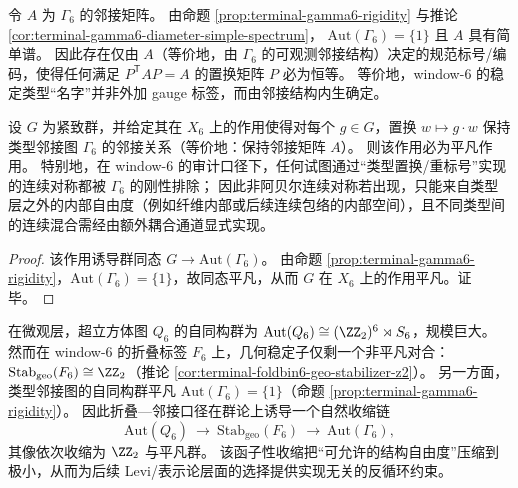 \begin{corollary}\label{cor:terminal-gamma6-canonical-addressing}
令 \(A\) 为 \(\Gamma_6\) 的邻接矩阵。
由命题 \ref{prop:terminal-gamma6-rigidity} 与推论 \ref{cor:terminal-gamma6-diameter-simple-spectrum}，
\(\mathrm{Aut}(\Gamma_6)=\{1\}\) 且 \(A\) 具有简单谱。
因此存在仅由 \(A\)（等价地，由 \(\Gamma_6\) 的可观测邻接结构）决定的规范标号/编码，使得任何满足
\(
P^{\mathsf T}AP=A
\)
的置换矩阵 \(P\) 必为恒等。
等价地，window-\(6\) 的稳定类型“名字”并非外加 gauge 标签，而由邻接结构内生确定。
\end{corollary}

\begin{corollary}\label{cor:terminal-gamma6-no-continuous-nonabelian-symmetry}
设 \(G\) 为紧致群，并给定其在 \(X_6\) 上的作用使得对每个 \(g\in G\)，置换 \(w\mapsto g\cdot w\) 保持类型邻接图 \(\Gamma_6\) 的邻接关系（等价地：保持邻接矩阵 \(A\)）。
则该作用必为平凡作用。
特别地，在 window-\(6\) 的审计口径下，任何试图通过“类型置换/重标号”实现的连续对称都被 \(\Gamma_6\) 的刚性排除；
因此非阿贝尔连续对称若出现，只能来自类型层之外的内部自由度（例如纤维内部或后续连续包络的内部空间），且不同类型间的连续混合需经由额外耦合通道显式实现。
\end{corollary}
\begin{proof}
该作用诱导群同态 \(G\to \mathrm{Aut}(\Gamma_6)\)。
由命题 \ref{prop:terminal-gamma6-rigidity}，\(\mathrm{Aut}(\Gamma_6)=\{1\}\)，故同态平凡，从而 \(G\) 在 \(X_6\) 上的作用平凡。证毕。
\end{proof}

\begin{remark}\label{rem:terminal-window6-symmetry-breaking-functor}
在微观层，超立方体图 \(Q_6\) 的自同构群为 \(\mathrm{Aut}(Q_6)\cong(\ZZ_2)^6\rtimes S_6\)，规模巨大。
然而在 window-\(6\) 的折叠标签 \(F_6\) 上，几何稳定子仅剩一个非平凡对合：
\(\mathrm{Stab}_{\mathrm{geo}}(F_6)\cong \ZZ_2\)（推论 \ref{cor:terminal-foldbin6-geo-stabilizer-z2}）。
另一方面，类型邻接图的自同构群平凡 \(\mathrm{Aut}(\Gamma_6)=\{1\}\)（命题 \ref{prop:terminal-gamma6-rigidity}）。
因此折叠—邻接口径在群论上诱导一个自然收缩链
\[
\mathrm{Aut}(Q_6)\ \longrightarrow\ \mathrm{Stab}_{\mathrm{geo}}(F_6)\ \longrightarrow\ \mathrm{Aut}(\Gamma_6),
\]
其像依次收缩为 \(\ZZ_2\) 与平凡群。
该函子性收缩把“可允许的结构自由度”压缩到极小，从而为后续 Levi/表示论层面的选择提供实现无关的反循环约束。
\end{remark}

